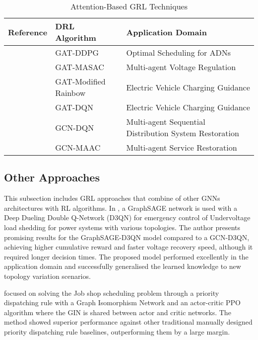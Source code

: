 \begin{table}[h!]
	\centering
	\caption{Attention-Based GRL Techniques}
	\begin{tabular}{|P{2cm}|P{4cm}|p{6cm}|  }
		\hline
		\textbf{Reference} & \textbf{DRL Algorithm} & \textbf{Application Domain} \\
		\hline
		\cite{xingRealtimeOptimalScheduling2023} & GAT-DDPG & Optimal Scheduling for ADNs  \\ \hline
		\cite{chenPhysicalassistedMultiagentGraph2023}  &  GAT-MASAC  & Multi-agent Voltage Regulation \\ \hline 
		\cite{xingBilevelGraphReinforcement2023} & GAT-Modified Rainbow & Electric Vehicle Charging Guidance \\ \hline
		\cite{xuRealtimeFastCharging2022} & GAT-DQN & Electric Vehicle Charging Guidance \\ \hline 
		\cite{zhaoLearningSequentialDistribution2022} & GCN-DQN & Multi-agent Sequential Distribution System Restoration \\ \hline
		\cite{fanAttentionBasedMultiAgentGraph2023} & GCN-MAAC & Multi-agent Service Restoration \\ \hline
	\end{tabular}
\end{table}


\subsection{Other Approaches}

This subsection includes \ac{GRL} approaches that combine of other \acp{GNN} architectures with \ac{RL} algorithms. In \cite{peiEmergencyControlStrategy2023}, a GraphSAGE network is used with a Deep Dueling Double Q-Network (D3QN) for emergency control of Undervoltage load shedding for power systems with various topologies. The author presents promising results for the GraphSAGE-D3QN model compared to a GCN-D3QN, achieving higher cumulative reward and faster voltage recovery speed, although it required longer decision times. The proposed model performed excellently in the application domain and successfully generalised the learned knowledge to new topology variation scenarios. \par
\cite{zhangLearningDispatchJob2020} focused on solving the Job shop scheduling problem through a priority dispatching rule with a Graph Isomorphism Network \cite{xuHowPowerfulAre2019} and an actor-critic \ac{PPO} algorithm where the GIN is shared between actor and critic networks. The method showed superior performance against other traditional manually designed priority dispatching rule baselines, outperforming them by a large margin.


